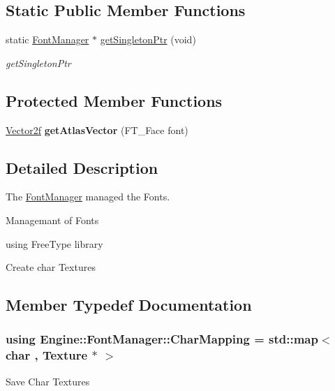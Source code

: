 \subsection*{Static Public Member Functions}
\begin{DoxyCompactItemize}
\item 
static \hyperlink{classEngine_1_1FontManager}{Font\+Manager} $\ast$ \hyperlink{classEngine_1_1FontManager_a5af489a1003b2d1db331ae72e560de3f}{get\+Singleton\+Ptr} (void)
\begin{DoxyCompactList}\small\item\em get\+Singleton\+Ptr \end{DoxyCompactList}\end{DoxyCompactItemize}
\subsection*{Protected Member Functions}
\begin{DoxyCompactItemize}
\item 
\hypertarget{classEngine_1_1FontManager_a051c7bda65ef456de8638acc30073c41}{}\hyperlink{classVector2}{Vector2f} {\bfseries get\+Atlas\+Vector} (F\+T\+\_\+\+Face font)\label{classEngine_1_1FontManager_a051c7bda65ef456de8638acc30073c41}

\end{DoxyCompactItemize}


\subsection{Detailed Description}
The \hyperlink{classEngine_1_1FontManager}{Font\+Manager} managed the Fonts. 

Managemant of Fonts


\begin{DoxyItemize}
\item using Free\+Type library
\item Create char Textures 
\end{DoxyItemize}

\subsection{Member Typedef Documentation}
\hypertarget{classEngine_1_1FontManager_aba32832f74f13b0bec53d5132f78bcc3}{}
\subsubsection[{Char\+Mapping}]{\setlength{\rightskip}{0pt plus 5cm}using {\bf Engine\+::\+Font\+Manager\+::\+Char\+Mapping} =  std\+::map$<$ char , {\bf Texture} $\ast$ $>$}\label{classEngine_1_1FontManager_aba32832f74f13b0bec53d5132f78bcc3}
Save Char Textures 

